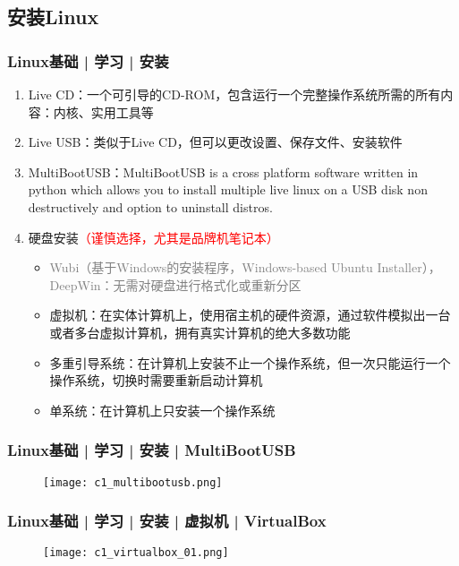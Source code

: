 \subsection{安装Linux}
\begin{frame}
  \frametitle{Linux基础 | 学习 | 安装}
  \begin{enumerate}[<+->]
    \item Live CD：一个可引导的CD-ROM，包含运行一个完整操作系统所需的所有内容：内核、实用工具等
    \item Live USB：类似于Live CD，但可以更改设置、保存文件、安装软件
    \item \alert{MultiBootUSB}：MultiBootUSB is a cross platform software written in python which allows you to install multiple live linux on a USB disk non destructively and option to uninstall distros.
    \item 硬盘安装\textcolor{red}{（谨慎选择，尤其是品牌机笔记本）}
      \begin{itemize}
        \item \textcolor{gray}{Wubi（基于Windows的安装程序，Windows-based Ubuntu Installer），DeepWin：无需对硬盘进行格式化或重新分区}
        \item 虚拟机：在实体计算机上，使用宿主机的硬件资源，通过软件模拟出一台或者多台虚拟计算机，拥有真实计算机的绝大多数功能
        \item 多重引导系统：在计算机上安装不止一个操作系统，但一次只能运行一个操作系统，切换时需要重新启动计算机
        \item 单系统：在计算机上只安装一个操作系统
      \end{itemize}
  \end{enumerate}
\end{frame}

\begin{frame}
  \frametitle{Linux基础 | 学习 | 安装 | MultiBootUSB}
  \begin{figure}
    \centering
    \texttt{[image: c1\_multibootusb.png]}
  \end{figure}
\end{frame}

\begin{frame}
  \frametitle{Linux基础 | 学习 | 安装 | 虚拟机 | VirtualBox}
  \begin{figure}
    \centering
    \texttt{[image: c1\_virtualbox\_01.png]}
  \end{figure}
\end{frame}

